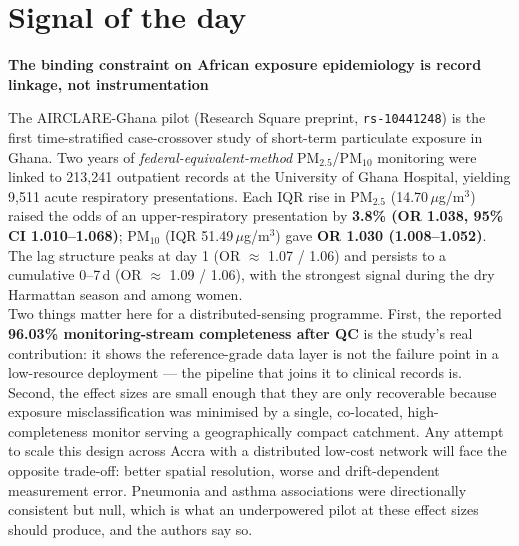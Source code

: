 \documentclass[10pt]{article}
\begin{document}
\vspace{6mm}

\section*{\sffamily\bfseries\color{Deep}Signal of the day}
\vspace{-1.5mm}{\color{Amber}\rule{\linewidth}{1.1pt}}\vspace{2.5mm}

\begin{keybox}
{\sffamily\bfseries\small\color{Deep}The binding constraint on African exposure
epidemiology is record linkage, not instrumentation}\\[1.6mm]
{\footnotesize
The AIRCLARE-Ghana pilot (Research Square preprint, \texttt{rs-10441248}) is the first
time-stratified case-crossover study of short-term particulate exposure in Ghana. Two
years of \emph{federal-equivalent-method} PM$_{2.5}$/PM$_{10}$ monitoring were linked to
213{,}241 outpatient records at the University of Ghana Hospital, yielding 9{,}511 acute
respiratory presentations. Each IQR rise in PM$_{2.5}$ (14.70\,$\mu$g/m$^3$) raised the
odds of an upper-respiratory presentation by
\textbf{3.8\% (OR 1.038, 95\% CI 1.010--1.068)}; PM$_{10}$ (IQR 51.49\,$\mu$g/m$^3$) gave
\textbf{OR 1.030 (1.008--1.052)}. The lag structure peaks at day 1
(OR $\approx$ 1.07 / 1.06) and persists to a cumulative 0--7\,d
(OR $\approx$ 1.09 / 1.06), with the strongest signal during the dry Harmattan season and
among women.\\[1.4mm]
Two things matter here for a distributed-sensing programme. First, the reported
\textbf{96.03\% monitoring-stream completeness after QC} is the study's real contribution:
it shows the reference-grade data layer is not the failure point in a low-resource
deployment --- the pipeline that joins it to clinical records is. Second, the effect sizes
are small enough that they are only recoverable because exposure misclassification was
minimised by a single, co-located, high-completeness monitor serving a geographically
compact catchment. Any attempt to scale this design across Accra with a distributed
low-cost network will face the opposite trade-off: better spatial resolution, worse and
drift-dependent measurement error. Pneumonia and asthma associations were directionally
consistent but null, which is what an underpowered pilot at these effect sizes should
produce, and the authors say so.\par}
\end{keybox}
\end{document}
